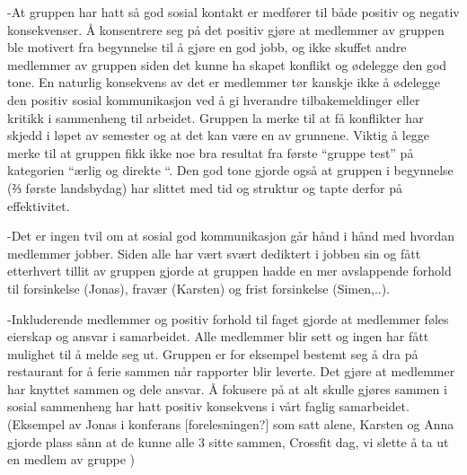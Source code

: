-At gruppen har hatt så god sosial kontakt er medfører til både positiv og negativ konsekvenser. Å konsentrere seg på det positiv gjøre at medlemmer av gruppen ble motivert fra begynnelse til å gjøre en god jobb, og ikke skuffet andre medlemmer av gruppen siden det kunne ha skapet konflikt og ødelegge den god tone. En naturlig konsekvens av det er medlemmer tør kanskje ikke å ødelegge den positiv sosial kommunikasjon ved å gi hverandre tilbakemeldinger eller kritikk i sammenheng til arbeidet. Gruppen la merke til at få konflikter har skjedd i løpet av semester og at det kan være en av grunnene. Viktig å legge merke til at gruppen fikk ikke noe bra resultat fra første “gruppe test” på kategorien “ærlig og direkte “. Den god tone gjorde også at gruppen i begynnelse (⅔ første landsbydag)  har slittet med tid og struktur og tapte derfor på effektivitet. 

-Det er ingen tvil om at sosial god kommunikasjon går hånd i hånd med hvordan medlemmer jobber. Siden alle har vært svært dediktert i jobben sin og fått etterhvert tillit av gruppen gjorde at gruppen hadde en mer avslappende forhold til forsinkelse (Jonas), fravær (Karsten) og frist forsinkelse (Simen,..). 

-Inkluderende medlemmer og positiv forhold til faget gjorde at medlemmer føles eierskap og ansvar i samarbeidet. Alle medlemmer blir sett og ingen har fått mulighet til å melde seg ut. Gruppen er for eksempel  bestemt seg å  dra på restaurant for å ferie sammen når rapporter blir leverte. Det gjøre at medlemmer har knyttet sammen og dele ansvar.  Å fokusere på at alt skulle gjøres sammen i sosial sammenheng har hatt positiv konsekvens i vårt faglig samarbeidet. (Eksempel av Jonas i konferans [forelesningen?] som satt alene, Karsten og Anna gjorde plass sånn at de kunne alle 3 sitte sammen, Crossfit dag, vi slette å ta ut en medlem av gruppe )









